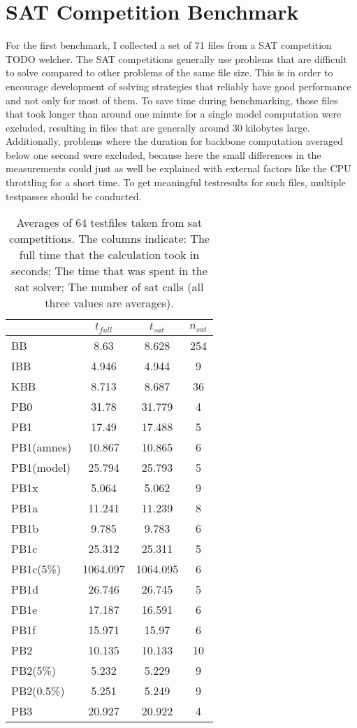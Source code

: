 \section{SAT Competition Benchmark}

For the first benchmark, I collected a set of 71 files from a SAT competition TODO welcher. The SAT competitions generally use problems that are difficult to solve compared to other problems of the same file size. This is in order to encourage development of solving strategies that reliably have good performance and not only for most of them. To save time during benchmarking, those files that took longer than around one minute for a single model computation were excluded, resulting in files that are generally around 30 kilobytes large. Additionally, problems where the duration for backbone computation averaged below one second were excluded, because here the small differences in the measurements could just as well be explained with external factors like the CPU throttling for a short time. To get meaningful testresults for such files, multiple testpasses should be conducted.

\begin{wraptable}{r}{7cm} %
\begin{tabular}{l| c c c }
 & $t_{full}$ & $t_{sat}$ & $n_{sat}$ \\
 \hline
BB & 8.63 & 8.628 & 254 \\
IBB & 4.946 & 4.944 & 9 \\
KBB & 8.713 & 8.687 & 36 \\
PB0 & 31.78 & 31.779 & 4 \\
PB1 & 17.49 & 17.488 & 5 \\
PB1(amnes) & 10.867 & 10.865 & 6 \\
PB1(model) & 25.794 & 25.793 & 5 \\
PB1x & 5.064 & 5.062 & 9 \\
PB1a & 11.241 & 11.239 & 8 \\
PB1b & 9.785 & 9.783 & 6 \\
PB1c & 25.312 & 25.311 & 5 \\
PB1c(5\%) & 1064.097 & 1064.095 & 6 \\
PB1d & 26.746 & 26.745 & 5 \\
PB1e & 17.187 & 16.591 & 6 \\
PB1f & 15.971 & 15.97 & 6 \\
PB2 & 10.135 & 10.133 & 10 \\
PB2(5\%) & 5.232 & 5.229 & 9 \\
PB2(0.5\%) & 5.251 & 5.249 & 9 \\
PB3 & 20.927 & 20.922 & 4 \\
\end{tabular}
\caption{Averages of 64 testfiles taken from sat competitions. The columns indicate: The full time that the calculation took in seconds; The time that was spent in the sat solver; The number of sat calls (all three values are averages). }
\label{tab:satCompAvg} %
\end{wraptable}

